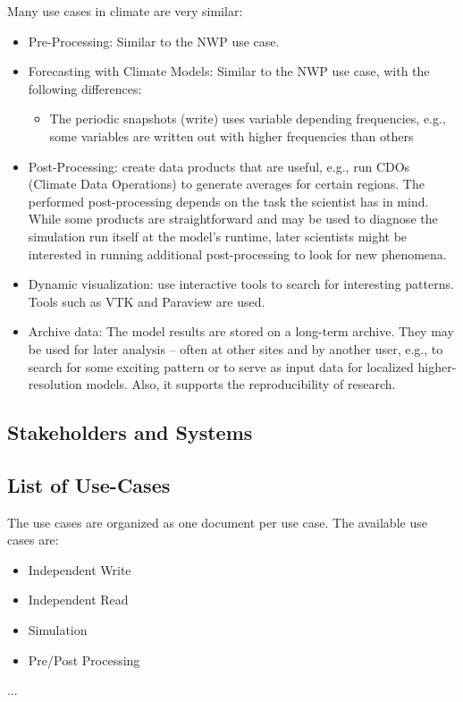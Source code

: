 Many use cases in climate are very similar:
\begin{itemize}
  \item Pre-Processing: Similar to the NWP use case.
  \item Forecasting with Climate Models: Similar to the NWP use case, with the following differences:
    \begin{itemize}
      \item The periodic snapshots (write) uses variable depending frequencies, e.g., some variables are written out with higher frequencies than others
    \end{itemize}
  \item Post-Processing: create data products that are useful, e.g., run CDOs (Climate Data Operations) to generate averages for certain regions. 
    The performed post-processing depends on the task the scientist has in mind. 
    While some products are straightforward and may be used to diagnose the simulation run itself at the model's runtime, later scientists might be interested in running additional post-processing to look for new phenomena.
  \item Dynamic visualization: use interactive tools to search for interesting patterns. 
    Tools such as VTK and  Paraview are used. 
  \item Archive data: The model results are stored on a long-term archive. 
    They may be used for later analysis --  often at other sites and by another user, e.g., to search for some exciting pattern or to serve as input data for localized higher-resolution models. 
    Also, it supports the reproducibility of research.
\end{itemize}

\subsection{Stakeholders and Systems}

\subsection{List of Use-Cases}

The use cases are organized as one document per use case. The available use cases are:
\begin{itemize}
  \item Independent Write
  \item Independent Read
  \item Simulation
  \item Pre/Post Processing
\end{itemize}

...

